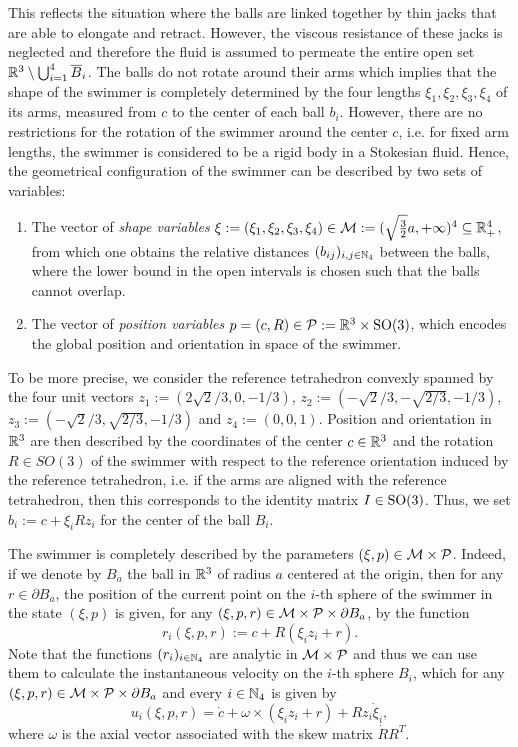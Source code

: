  This reflects the situation where the balls are linked together by thin jacks that are able to elongate and retract. However, the viscous resistance of these jacks is neglected and therefore the fluid is assumed to permeate the entire open set $\mathbb{R}^3 \setminus \bigcup_{i = 1}^{4} \overline{B}_i$. The balls do not rotate around their arms which implies that the shape of the swimmer is completely determined by the four lengths $\xi_1, \xi_2, \xi_3, \xi_4$ of its arms, measured from $c$ to the center of each ball $b_i$. However, there are no restrictions for the rotation of the swimmer around the center $c$, i.e. for fixed arm lengths, the swimmer is considered to be a rigid body in a Stokesian fluid.
Hence, the geometrical configuration of the swimmer can be described by two sets of variables:
\begin{enumerate}
	\item The vector of \emph{shape variables} $\xi := (\xi_1, \xi_2, \xi_3, \xi_4) \in \mathcal{M} := (\sqrt{\tfrac{3}{2}}a, +\infty)^4 \subseteq \mathbb{R}_+^4$, from which one obtains the relative distances $(b_{ij})_{i,j \in \mathbb{N}_4}$ between the balls,  where the lower bound in the open intervals is chosen such that the balls cannot overlap.
	\item The vector of \emph{position variables} $p = (c, R) \in \mathcal{P} :=  \mathbb{R}^3 \times \operatorname{SO}(3)$, which encodes the global position and orientation in space of the swimmer.
\end{enumerate}
To be more precise, we consider the reference tetrahedron convexly spanned by the four unit vectors $z_1 := (2 \sqrt{2}/3,0,-1/3)$, $z_2 := (-\sqrt{2}/3,-\sqrt{2/3},-1/3)$, $z_3 := (-\sqrt{2}/3,\sqrt{2/3},-1/3)$ and $z_4 := (0,0,1)$. Position and orientation in $\mathbb{R}^3$ are then described by the coordinates of the center $c \in \mathbb{R}^3$ and the rotation $R \in SO(3)$ of the swimmer with respect to the reference orientation induced by the reference tetrahedron, i.e. if the arms are aligned with the reference tetrahedron, then this corresponds to the identity matrix $I \in \operatorname{SO}(3)$. Thus, we set $b_i := c + \xi_i R z_i$ for the center of the ball $B_i$.

The swimmer is completely described by the parameters $(\xi, p) \in \mathcal{M} \times \mathcal{P}$. Indeed, if we denote by $B_a$ the ball in $\mathbb{R}^3$ of radius $a$ centered at the origin, then for any $r \in \partial B_a$, the position of the current point on the $i$-th sphere of the swimmer in the state $(\xi, p)$ is given, for any $(\xi, p, r) \in \mathcal{M} \times \mathcal{P} \times \partial B_a$, by the function
\begin{equation}
	r_i(\xi, p, r) :=  c + R(\xi_i z_i + r).
\end{equation}
Note that the functions $(r_i)_{i \in \mathbb{N}_4}$ are analytic in $\mathcal{M}  \times \mathcal{P}$ and thus we can use them to calculate the instantaneous velocity on the $i$-th sphere $B_i$, which for any $(\xi, p, r) \in \mathcal{M} \times \mathcal{P} \times \partial B_a$ and every $i \in \mathbb{N}_4$ is given by
\begin{equation}
	u_i(\xi, p, r) = \dot{c} + \omega \times (\xi_i z_i + r) + R z_i \dot{\xi}_i,
\end{equation}
where $\omega$ is the axial vector associated with the skew matrix $\dot{R} R^T$.


